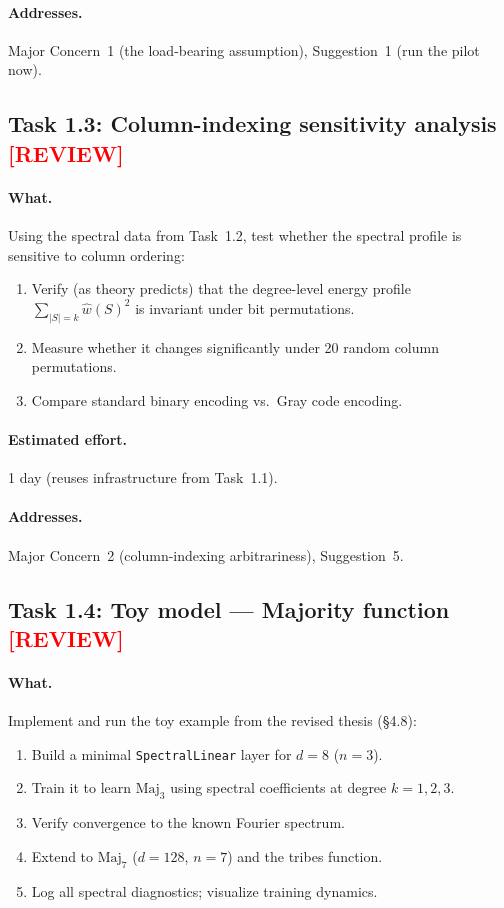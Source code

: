 \documentclass[12pt,a4paper]{article}
\newcommand{\review}{\texorpdfstring{\textcolor{red}{\textbf{[REVIEW]}}}{[REVIEW]}}
\begin{document}
\paragraph{Addresses.} Major Concern~1 (the load-bearing assumption), Suggestion~1 (run the pilot now).


\subsection{Task 1.3: Column-indexing sensitivity analysis \review}

\paragraph{What.} Using the spectral data from Task~1.2, test whether the spectral profile is sensitive to column ordering:
\begin{enumerate}
    \item Verify (as theory predicts) that the degree-level energy profile $\sum_{|S|=k} \hat{w}(S)^2$ is invariant under bit permutations.
    \item Measure whether it changes significantly under 20 random column permutations.
    \item Compare standard binary encoding vs.\ Gray code encoding.
\end{enumerate}

\paragraph{Estimated effort.} 1 day (reuses infrastructure from Task~1.1).

\paragraph{Addresses.} Major Concern~2 (column-indexing arbitrariness), Suggestion~5.


\subsection{Task 1.4: Toy model --- Majority function \review}

\paragraph{What.} Implement and run the toy example from the revised thesis (\S4.8):
\begin{enumerate}
    \item Build a minimal \texttt{SpectralLinear} layer for $d = 8$ ($n = 3$).
    \item Train it to learn $\text{Maj}_3$ using spectral coefficients at degree $k = 1, 2, 3$.
    \item Verify convergence to the known Fourier spectrum.
    \item Extend to $\text{Maj}_7$ ($d = 128$, $n = 7$) and the tribes function.
    \item Log all spectral diagnostics; visualize training dynamics.
\end{enumerate}
\end{document}
